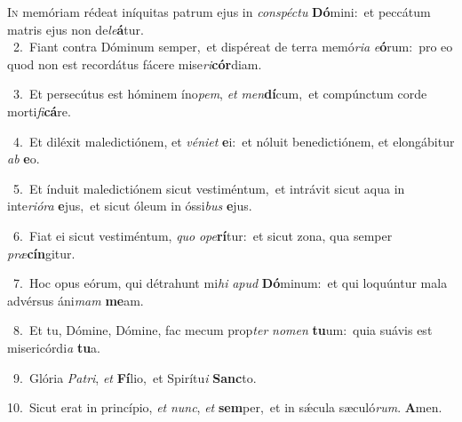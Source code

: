\lettrine{\initial\textcolor{\initialcolor}{I}}{n} memóriam rédeat iníquitas patrum ejus in \textit{con}\-\textit{spéc}\textit{tu} \textbf{Dó}\-mini:~\star et peccátum matris ejus non de\-\textit{le}\-\textbf{á}tur.\\
{\numbfont\textcolor{\numbcolor}{~2.}}~Fiant contra Dóminum semper,~\dagger et dispéreat de terra memó\-\textit{ri}\-\textit{a} \textit{e}\-\textbf{ó}rum:~\star pro eo quod non est recordátus fácere mise\-\textit{ri}\-\textbf{cór}diam.\par
{\numbfont\textcolor{\numbcolor}{~3.}}~Et persecútus est hóminem íno\-\textit{pem}\-, \textit{et} \textit{men}\-\textbf{dí}cum,~\star et compúnctum corde morti\-\textit{fi}\-\textbf{cá}re.\par
{\numbfont\textcolor{\numbcolor}{~4.}}~Et diléxit maledictiónem, et \textit{vé}\-\textit{ni}\textit{et} \textbf{e}\-i:~\star et nóluit benedictiónem, et elongábitur \textit{ab} \textbf{e}\-o.\par
{\numbfont\textcolor{\numbcolor}{~5.}}~Et índuit maledictiónem sicut vestiméntum,~\dagger et intrávit sicut aqua in inte\-\textit{ri}\-\textit{ó}\textit{ra} \textbf{e}\-jus,~\star et sicut óleum in óssi\textit{bus} \textbf{e}\-jus.\par
{\numbfont\textcolor{\numbcolor}{~6.}}~Fiat ei sicut vestiméntum, \textit{quo} \textit{o}\-\textit{pe}\textbf{rí}tur:~\star et sicut zona, qua semper \textit{præ}\-\textbf{cín}gitur.\par
{\numbfont\textcolor{\numbcolor}{~7.}}~Hoc opus eórum, qui détrahunt mi\textit{hi} \textit{a}\-\textit{pud} \textbf{Dó}\-minum:~\star et qui loquúntur mala advérsus áni\textit{mam} \textbf{me}\-am.\par
{\numbfont\textcolor{\numbcolor}{~8.}}~Et tu, Dómine, Dómine, fac mecum prop\textit{ter} \textit{no}\-\textit{men} \textbf{tu}\-um:~\star quia suávis est misericórdi\textit{a} \textbf{tu}\-a.\par
{\numbfont\textcolor{\numbcolor}{~9.}}~Glória \textit{Pa}\-\textit{tri}, \textit{et} \textbf{Fí}\-lio,~\star et Spirítu\textit{i} \textbf{Sanc}\-to.\par
{\numbfont\textcolor{\numbcolor}{10.}}~Sicut erat in princípio, \textit{et} \textit{nunc}\-, \textit{et} \textbf{sem}\-per,~\star et in sǽcula sæculó\-\textit{rum}\-. \textbf{A}\-men.\par
